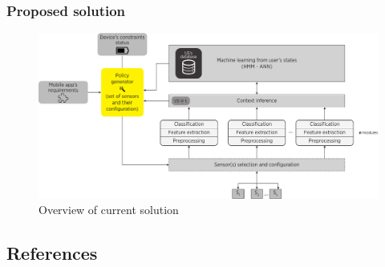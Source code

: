 \documentclass[compress,9pt,xcolor={dvipsnames,table}]{beamer}
\begin{document}
\begin{frame}\frametitle{Proposed solution}
\begin{figure}[tb]
  \centering
  \includegraphics[width=\textwidth]{../../../resources/images/vectors/policy-manager-incorporation}
  \caption{Overview of current solution}
  \label{fig:solution}
\end{figure}
\end{frame}

\subsection{References}

% 

\end{document}
